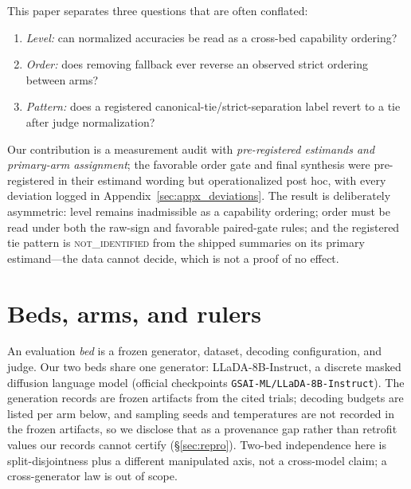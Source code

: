 \documentclass{article}
\begin{document}
This paper separates three questions that are often conflated:
\begin{enumerate}
  \item \emph{Level:} can normalized accuracies be read as a cross-bed
        capability ordering?
  \item \emph{Order:} does removing fallback ever reverse an observed strict
        ordering between arms?
  \item \emph{Pattern:} does a registered canonical-tie/strict-separation
        label revert to a tie after judge normalization?
\end{enumerate}
Our contribution is a measurement audit with \emph{pre-registered estimands
and primary-arm assignment}; the favorable order gate and final synthesis were
pre-registered in their estimand wording but operationalized post hoc, with
every deviation logged in Appendix~\ref{sec:appx_deviations}.  The result is
deliberately asymmetric: level remains inadmissible as a capability ordering;
order must be read under both the raw-sign and favorable paired-gate rules; and
the registered tie pattern is \textsc{not\_identified} from the shipped
summaries on its primary estimand---the data cannot decide, which is not a
proof of no effect.

\section{Beds, arms, and rulers}
\label{sec:beds}

An evaluation \emph{bed} is a frozen generator, dataset, decoding
configuration, and judge.  Our two beds share one generator:
LLaDA-8B-Instruct, a discrete
masked diffusion language model \citep{nie2025llada}
(official checkpoints \texttt{GSAI-ML/LLaDA-8B-Instruct}).  The generation
records are frozen artifacts from the cited trials; decoding budgets are
listed per arm below, and sampling seeds and temperatures are not recorded
in the frozen artifacts, so we disclose that as a provenance gap rather than
retrofit values our records cannot certify
(\S\ref{sec:repro}).  Two-bed independence
here is split-disjointness plus a different manipulated axis, not a
cross-model claim; a cross-generator law is out of scope.
\end{document}
